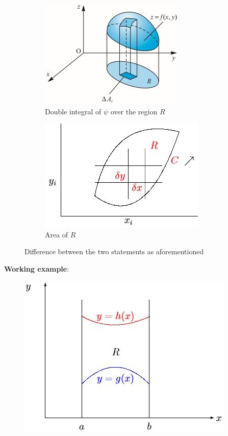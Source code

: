\documentclass[10pt,a4paper]{article}
\begin{document}
\begin{figure}[h]
\centering
\begin{subfigure}{.5\textwidth}
  \centering
  \includegraphics[width=.6\linewidth]{Diff.JPG}
  \caption{Double integral of $\psi$ over the region $R$}
  \label{fig:sub1}
\end{subfigure}%
\begin{subfigure}{.5\textwidth}
  \centering
  \includegraphics[width=.6\linewidth]{Doubleint.JPG}
  \caption{Area of $R$}
  \label{fig:sub2}
\end{subfigure}
\caption{Difference between the two statements as aforementioned}
\label{fig:test}
\end{figure}

\textbf{Working example}:

\begin{figure} [h!]
    \centering
    \includegraphics[scale=0.6]{How.JPG}
\end{figure}
\end{document}
